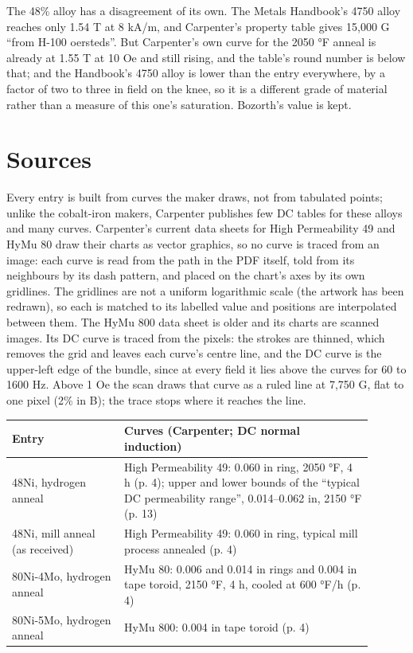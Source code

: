 \documentclass[
  11pt,
]{article}
\begin{document}
The 48\% alloy has a disagreement of its own. The Metals Handbook's 4750 alloy reaches only 1.54 T at 8 kA/m, and Carpenter's property table gives 15,000 G ``from H-100 oersteds''. But Carpenter's own curve for the 2050 °F anneal is already at 1.55 T at 10 Oe and still rising, and the table's round number is below that; and the Handbook's 4750 alloy is lower than the entry everywhere, by a factor of two to three in field on the knee, so it is a different grade of material rather than a measure of this one's saturation. Bozorth's value is kept.

\section{Sources}\label{sources}

Every entry is built from curves the maker draws, not from tabulated points; unlike the cobalt-iron makers, Carpenter publishes few DC tables for these alloys and many curves. Carpenter's current data sheets for High Permeability 49 \cite{carpenter-hp49} and HyMu 80 \cite{carpenter-hymu80} draw their charts as vector graphics, so no curve is traced from an image: each curve is read from the path in the PDF itself, told from its neighbours by its dash pattern, and placed on the chart's axes by its own gridlines. The gridlines are not a uniform logarithmic scale (the artwork has been redrawn), so each is matched to its labelled value and positions are interpolated between them. The HyMu 800 data sheet \cite{carpenter-hymu800} is older and its charts are scanned images. Its DC curve is traced from the pixels: the strokes are thinned, which removes the grid and leaves each curve's centre line, and the DC curve is the upper-left edge of the bundle, since at every field it lies above the curves for 60 to 1600 Hz. Above 1 Oe the scan draws that curve as a ruled line at 7,750 G, flat to one pixel (2\% in B); the trace stops where it reaches the line.

\begin{center}
\begin{tabular}{p{0.28\linewidth}p{0.62\linewidth}}
\toprule
Entry & Curves (Carpenter; DC normal induction) \\
\midrule
48Ni, hydrogen anneal & High Permeability 49: 0.060 in ring, 2050 °F, 4 h (p. 4); upper and lower bounds of the ``typical DC permeability range'', 0.014--0.062 in, 2150 °F (p. 13) \\
48Ni, mill anneal (as received) & High Permeability 49: 0.060 in ring, typical mill process annealed (p. 4) \\
80Ni-4Mo, hydrogen anneal & HyMu 80: 0.006 and 0.014 in rings and 0.004 in tape toroid, 2150 °F, 4 h, cooled at 600 °F/h (p. 4) \\
80Ni-5Mo, hydrogen anneal & HyMu 800: 0.004 in tape toroid (p. 4) \\
\bottomrule
\end{tabular}
\end{center}
\end{document}
